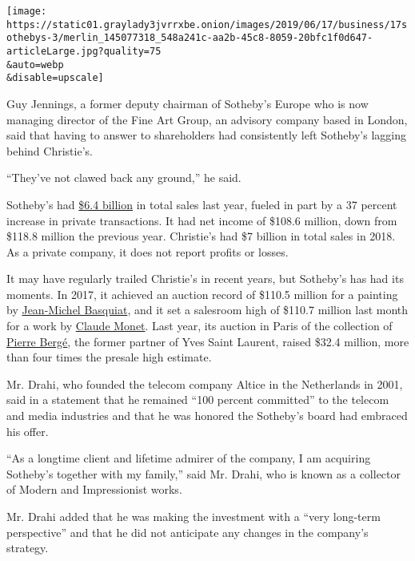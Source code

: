 \texttt{[image: https://static01.graylady3jvrrxbe.onion/images/2019/06/17/business/17sothebys-3/merlin\_145077318\_548a241c-aa2b-45c8-8059-20bfc1f0d647-articleLarge.jpg?quality=75\\\&auto=webp\\\&disable=upscale]}

Guy Jennings, a former deputy chairman of Sotheby's Europe who is now
managing director of the Fine Art Group, an advisory company based in
London, said that having to answer to shareholders had consistently left
Sotheby's lagging behind Christie's.

``They've not clawed back any ground,'' he said.

Sotheby's had
\href{https://www.theartnewspaper.com/news/sothebys-sales-up-16-percent-in-2018-thanks-to-a-boost-in-private-sales}{\$6.4
billion} in total sales last year, fueled in part by a 37 percent
increase in private transactions. It had net income of \$108.6 million,
down from \$118.8 million the previous year. Christie's had \$7 billion
in total sales in 2018. As a private company, it does not report profits
or losses.

It may have regularly trailed Christie's in recent years, but Sotheby's
has had its moments. In 2017, it achieved an auction record of \$110.5
million for a painting by
\href{https://www.nytimes3xbfgragh.onion/2017/05/18/arts/jean-michel-basquiat-painting-is-sold-for-110-million-at-auction.html}{Jean-Michel
Basquiat}, and it set a salesroom high of \$110.7 million last month for
a work by
\href{https://www.nytimes3xbfgragh.onion/2019/05/14/arts/monet-auction-110-million.html}{Claude
Monet}. Last year, its auction in Paris of the collection of
\href{https://www.sothebys.com/en/articles/pierre-berges-visionary-collection-breaks-records-in-paris}{Pierre
Bergé}, the former partner of Yves Saint Laurent, raised \$32.4 million,
more than four times the presale high estimate.

Mr. Drahi, who founded the telecom company Altice in the Netherlands in
2001, said in a statement that he remained ``100 percent committed'' to
the telecom and media industries and that he was honored the Sotheby's
board had embraced his offer.

``As a longtime client and lifetime admirer of the company, I am
acquiring Sotheby's together with my family,'' said Mr. Drahi, who is
known as a collector of Modern and Impressionist works.

Mr. Drahi added that he was making the investment with a ``very
long-term perspective'' and that he did not anticipate any changes in
the company's strategy.

